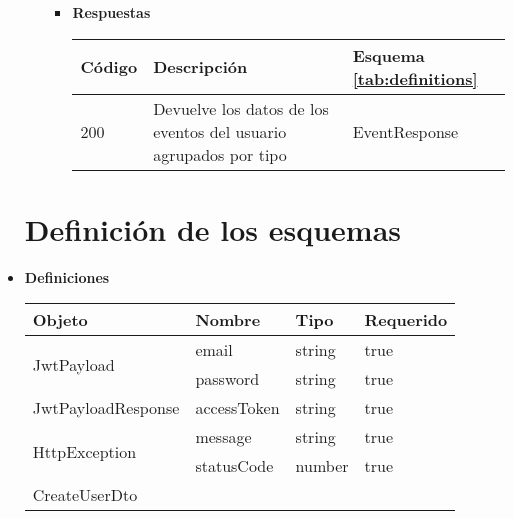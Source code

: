 \begin{itemize}
\begin{itemize}
\begin{itemize}
                \item \textbf{Respuestas}
                    \begin{table}[h]
                        \centering
                        \begin{tabular}{ l  p{6cm}  l } 
                            \toprule
                             Código & Descripción & Esquema \ref{tab:definitions}\\ 
                             \midrule
                            200 & Devuelve los datos de los eventos del usuario agrupados por tipo & EventResponse \\  
                            \bottomrule
                        \end{tabular} 
                    \end{table}

            \end{itemize} 
    \end{itemize} 
 
 \newpage
 \section{Definición de los esquemas}
 \item \textbf{Definiciones} 
        \begin{table}[h]
            \centering
            
        
        \begin{tabular}{ l l l l } 
        
            \toprule
            \textbf{Objeto} & \textbf{Nombre} & \textbf{Tipo} & \textbf{Requerido} \\
            \midrule
            
            \multirow{2}{*}{JwtPayload}
            & email & string & true \\ 
            & password & string & true \\ 
            \bottomrule
            
            \multirow{1}{*}{JwtPayloadResponse}
            & accessToken & string & true \\
            \bottomrule
            
            \multirow{2}{*}{HttpException}
            & message & string & true \\ 
            & statusCode & number & true \\
            \bottomrule
    
    
            \multirow{2}{*}{CreateUserDto}
            

\end{tabular}
\end{table}
\end{itemize}
